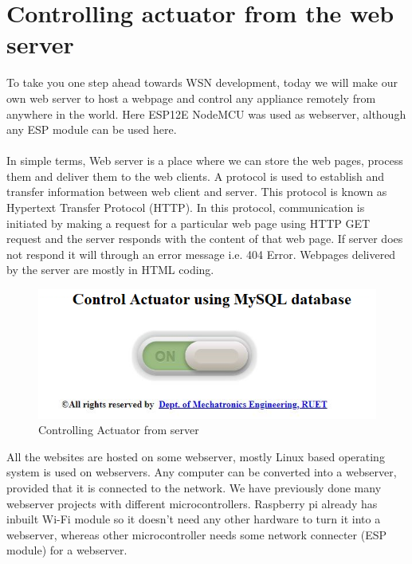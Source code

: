 \section{Controlling actuator from the web server}
To take you one step ahead towards WSN development, today we will make our own web server to host a webpage and control any appliance remotely from anywhere in the world. Here ESP12E NodeMCU was used as webserver, although any ESP module can be used here.\\\\
In simple terms, Web server is a place where we can store the web pages, process them and deliver them to the web clients. A protocol is used to establish and transfer information between web client and server. This protocol is known as Hypertext Transfer Protocol (HTTP). In this protocol, communication is initiated by making a request for a particular web page using HTTP GET request and the server responds with the content of that web page. If server does not respond it will through an error message i.e. 404 Error. Webpages delivered by the server are mostly in HTML coding.
\begin{figure}[H]
  \centering
  \includegraphics[width=6in]{42}
  \caption{Controlling Actuator from server }\label{fig42}
\end{figure}
All the websites are hosted on some webserver, mostly Linux based operating system is used on webservers. Any computer can be converted into a webserver, provided that it is connected to the network. We have previously done many webserver projects with different microcontrollers. Raspberry pi already has inbuilt Wi-Fi module so it doesn't need any other hardware to turn it into a webserver, whereas other microcontroller needs some network connecter (ESP module) for a webserver.
